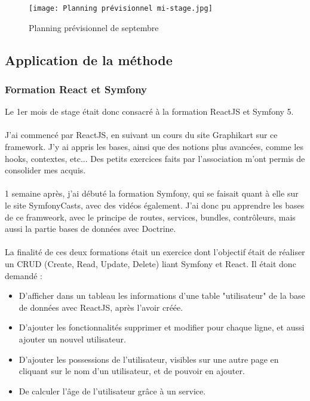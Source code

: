 \begin{figure}[H]
    \centering
    \texttt{[image: Planning prévisionnel mi-stage.jpg]}
    \caption{Planning prévisionnel de septembre}
\end{figure}

\pagebreak
\subsection{Application de la méthode}

\subsubsection{Formation React et Symfony}

Le 1er mois de stage était donc consacré à la formation ReactJS et Symfony 5.\\\\
J'ai commencé par ReactJS, en suivant un cours du site Graphikart sur ce framework. 
J'y ai appris les bases, ainsi que des notions plus avancées, comme les hooks, contextes, etc...
Des petits exercices faits par l'association m'ont permis de consolider mes acquis.\\\\

1 semaine après, j'ai débuté la formation Symfony, qui se faisait quant à elle sur le site SymfonyCasts, avec des vidéos également.
J'ai donc pu apprendre les bases de ce framweork, avec le principe de routes, services, bundles, contrôleurs, mais aussi la partie bases de données avec Doctrine.\\\\

La finalité de ces deux formations était un exercice dont l'objectif était de réaliser un CRUD (Create, Read, Update, Delete) liant Symfony et React.
Il était donc demandé :\\
\begin{itemize}
    \item D'afficher dans un tableau les informations d'une table "utilisateur" de la base de données avec ReactJS, après l'avoir créée.
    \item D'ajouter les fonctionnalités supprimer et modifier pour chaque ligne, et aussi ajouter un nouvel utilisateur.
    \item D'ajouter les possessions de l'utilisateur, visibles sur une autre page en cliquant sur le nom d'un utilisateur, et de pouvoir en ajouter.
    \item De calculer l'âge de l'utilisateur grâce à un service.
\end{itemize}

